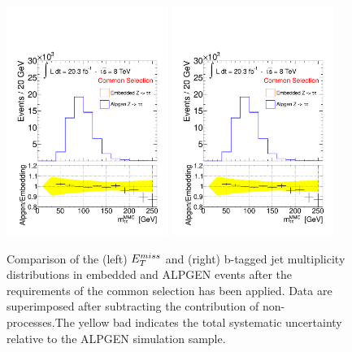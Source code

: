 \begin{figure}[tp]
     \begin{center}

           \includegraphics[page=2, width=0.47\textwidth]{figure/emb_plots.pdf}
            \includegraphics[page=3, width=0.47\textwidth]{figure/emb_plots.pdf}

    \end{center}
    \caption{Comparison of the (left)  $E_{T}^{miss}$  and (right) b-tagged jet multiplicity distributions in
	embedded and ALPGEN \Ztautau events after the requirements of the common selection has been applied.
	Data are superimposed after subtracting  the contribution of non-\Ztautau processes.The yellow bad indicates
	 the total systematic uncertainty  relative to the ALPGEN simulation sample.}
   \label{fig:emb_vs_alp}
\end{figure}


